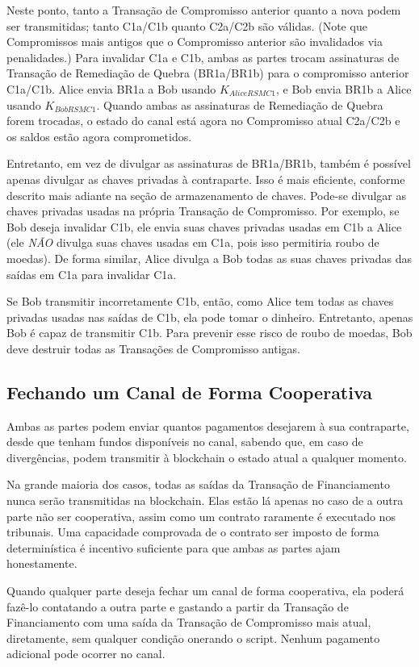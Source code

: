 \documentclass[letterpaper,11pt]{article}
\begin{document}
Neste ponto, tanto a Transação de Compromisso anterior quanto a nova podem
ser transmitidas; tanto C1a/C1b quanto C2a/C2b são válidas. (Note que
Compromissos mais antigos que o Compromisso anterior são invalidados via
penalidades.) Para invalidar C1a e C1b, ambas as partes trocam assinaturas
de Transação de Remediação de Quebra (BR1a/BR1b) para o compromisso
anterior C1a/C1b. Alice envia BR1a a Bob usando $K_{AliceRSMC1}$, e Bob
envia BR1b a Alice usando $K_{BobRSMC1}$. Quando ambas as assinaturas de
Remediação de Quebra forem trocadas, o estado do canal está agora no
Compromisso atual C2a/C2b e os saldos estão agora comprometidos.

Entretanto, em vez de divulgar as assinaturas de BR1a/BR1b, também é
possível apenas divulgar as chaves privadas à contraparte. Isso é mais
eficiente, conforme descrito mais adiante na seção de armazenamento de
chaves. Pode-se divulgar as chaves privadas usadas na própria Transação de
Compromisso. Por exemplo, se Bob deseja invalidar C1b, ele envia suas
chaves privadas usadas em C1b a Alice (ele \textit{NÃO} divulga suas chaves
usadas em C1a, pois isso permitiria roubo de moedas). De forma similar,
Alice divulga a Bob todas as suas chaves privadas das saídas em C1a para
invalidar C1a.

Se Bob transmitir incorretamente C1b, então, como Alice tem todas as chaves
privadas usadas nas saídas de C1b, ela pode tomar o dinheiro. Entretanto,
apenas Bob é capaz de transmitir C1b. Para prevenir esse risco de roubo de
moedas, Bob deve destruir todas as Transações de Compromisso antigas.

\subsection{Fechando um Canal de Forma Cooperativa}

Ambas as partes podem enviar quantos pagamentos desejarem à sua contraparte,
desde que tenham fundos disponíveis no canal, sabendo que, em caso de
divergências, podem transmitir à blockchain o estado atual a qualquer
momento.

Na grande maioria dos casos, todas as saídas da Transação de Financiamento
nunca serão transmitidas na blockchain. Elas estão lá apenas no caso de a
outra parte não ser cooperativa, assim como um contrato raramente é
executado nos tribunais. Uma capacidade comprovada de o contrato ser
imposto de forma determinística é incentivo suficiente para que ambas as
partes ajam honestamente.

Quando qualquer parte deseja fechar um canal de forma cooperativa, ela
poderá fazê-lo contatando a outra parte e gastando a partir da Transação
de Financiamento com uma saída da Transação de Compromisso mais atual,
diretamente, sem qualquer condição onerando o script. Nenhum pagamento
adicional pode ocorrer no canal.
\end{document}
